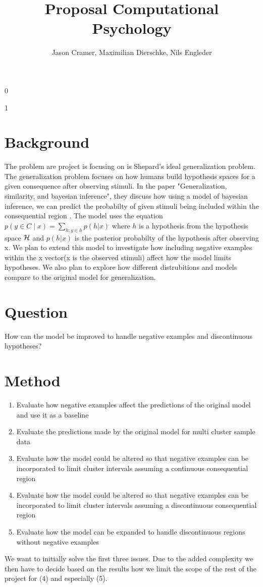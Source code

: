 \documentclass[]{scrartcl}
\title{Proposal Computational Psychology}
\begin{document}
\def\isblind{1}
\if\isblind0
    \author{Jason Cramer, Maximilian Dierschke, Nils Engleder}\fi
\if \isblind1
    \author{}\fi
\maketitle
\section{Background}
The problem are project is focusing on is Shepard's ideal generalization problem. The generalization problem focuses on how humans build hypothesis spaces for a given consequence after observing stimuli.
In the paper "Generalization, similarity, and bayesian inference", they discuss how using a model of bayesian inference, we can predict the probabilty of given stimuli being included within the consequential region \cite{Tenenbaum}.
The model uses the equation $p(y \in C \mid x) = \sum\limits_{h:y\in h} p(h | x)$ where $h$ is a hypothesis from the hypothesis space ${\cal H}$ and $p(h | x)$ is the posterior probabilty of  the hypothesis after observing x.
We plan to extend this model to investigate how including negative examples within the x vector(x is the observed stimuli) affect how the model limits hypotheses. We also plan to explore how different distrubitions and models compare to the original model for generalization.
\section{Question}
How can the model be improved to handle negative examples and discontinuous hypotheses?
\section{Method}
\begin{enumerate}[(1)]
	\item Evaluate how negative examples affect the predictions of the original model and use it as a baseline
	\item Evaluate the predictions made by the original model for multi cluster sample data 
	\item Evaluate how the model could be altered so that negative examples can be incorporated to limit cluster intervals assuming a continuous consequential region
	\item Evaluate how the model could be altered so that negative examples can be incorporated to limit cluster intervals assuming a discontinuous consequential region
	\item Evaluate how the model can be expanded to handle discontinuous regions without negative examples
\end{enumerate} 
We want to initially solve the first three issues. Due to the added complexity we then have to decide based on the results how we limit the scope of the rest of the project for (4) and especially (5).


\nocite{*}
\printbibliography
\end{document}
